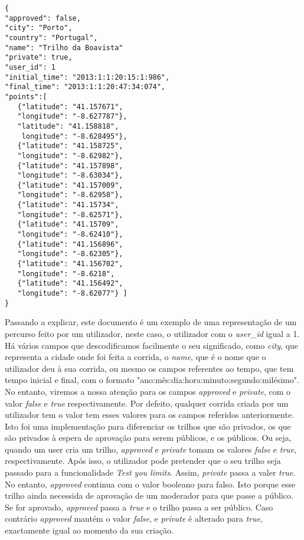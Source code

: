 \documentclass[twocolumn,twoside,10pt,a4paper]{article}
\begin{document}
\begin{lstlisting}
{
"approved": false,
"city": "Porto",
"country": "Portugal",
"name": "Trilho da Boavista"
"private": true,
"user_id": 1
"initial_time": "2013:1:1:20:15:1:986",
"final_time": "2013:1:1:20:47:34:074",
"points":[
   {"latitude": "41.157671",
   "longitude": "-8.627787"},
   "latitude": "41.158818",
    longitude": "-8.628495"},
   {"latitude": "41.158725",
   "longitude": "-8.62982"},
   {"latitude": "41.157898",
   "longitude": "-8.63034"},
   {"latitude": "41.157009",
   "longitude": "-8.62958"},
   {"latitude": "41.15734",
   "longitude": "-8.62571"},
   {"latitude": "41.15709",
   "longitude": "-8.62410"},
   {"latitude": "41.156896",
   "longitude": "-8.62305"},
   {"latitude": "41.156702",
   "longitude": "-8.6218",
   {"latitude": "41.156492",
   "longitude": "-8.62077"} ]
}
\end{lstlisting}

Passando a explicar, este documento é um exemplo de uma representação de um percurso feito por um utilizador, neste caso, o utilizador com o \textit{user\_id} igual a 1. Há vários campos que descodificamos facilmente o seu significado, como \textit{city}, que representa a cidade onde foi feita a corrida, o \textit{name}, que é o nome que o utilizador deu à sua corrida, ou mesmo os campos referentes ao tempo, que tem tempo inicial e final, com o formato "ano:mês:dia:hora:minuto:segundo:milésimo". No entanto, viremos a nossa atenção para os campos \textit{approved} e \textit{private}, com o valor \textit{false} e \textit{true} respectivamente. Por defeito, qualquer corrida criada por um utilizador tem o valor tem esses valores para os campos referidos anteriormente. Isto foi uma implementação para diferenciar os trilhos que são privados, os que são privados à espera de aprovação para serem públicos, e os públicos. Ou seja, quando um user cria um trilho, \textit{approved} e \textit{private} tomam os valores \textit{false} e \textit{true}, respectivamente. Após isso, o utilizador pode pretender que o seu trilho seja passado para a funcionalidade \textit{Test you limits}. Assim, \textit{private} passa a valer \textit{true}. No entanto, \textit{approved} continua com o valor booleano para falso. Isto porque esse trilho ainda necessida de aprovação de um moderador para que passe a público. Se for aprovado, \textit{approved} passa a \textit{true} e o trilho passa a ser público. Caso contrário \textit{approved} mantém o valor \textit{false}, e \textit{private} é alterado para \textit{true}, exactamente igual ao momento da sua criação.
\end{document}
